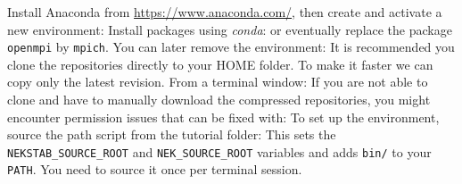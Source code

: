{}
\markdownRendererSectionEnd \markdownRendererSectionBegin
{}\markdownRendererInterblockSeparator
{}Install Anaconda from \url{https://www.anaconda.com/}, then create and activate a new environment:\markdownRendererInterblockSeparator
{}\markdownRendererInterblockSeparator
{}Install packages using \textit{conda}:\markdownRendererInterblockSeparator
{}\markdownRendererInterblockSeparator
{}or eventually replace the package \texttt{openmpi} by \texttt{mpich}.\markdownRendererInterblockSeparator
{}\markdownRendererInterblockSeparator
{}You can later remove the environment:\markdownRendererInterblockSeparator
{}\markdownRendererInterblockSeparator
{}\newpage\markdownRendererInterblockSeparator
{}
\markdownRendererSectionEnd 
\markdownRendererSectionEnd \markdownRendererSectionBegin
{}\markdownRendererInterblockSeparator
{}It is recommended you clone the repositories directly to your HOME folder. To make it faster we can copy only the latest revision. From a terminal window:\markdownRendererInterblockSeparator
{}\markdownRendererInterblockSeparator
{}\markdownRendererInterblockSeparator
{}If you are not able to clone and have to manually download the compressed repositories, you might encounter permission issues that can be fixed with:\markdownRendererInterblockSeparator
{}\markdownRendererInterblockSeparator
{}\markdownRendererSectionBegin
{}\markdownRendererInterblockSeparator
{}To set up the environment, source the path script from the tutorial folder:\markdownRendererInterblockSeparator
{}\markdownRendererInterblockSeparator
{}This sets the \texttt{NEKSTAB_SOURCE_ROOT} and \texttt{NEK_SOURCE_ROOT} variables and adds \texttt{bin/} to your \texttt{PATH}. You need to source it once per terminal session. \newpage\markdownRendererInterblockSeparator
